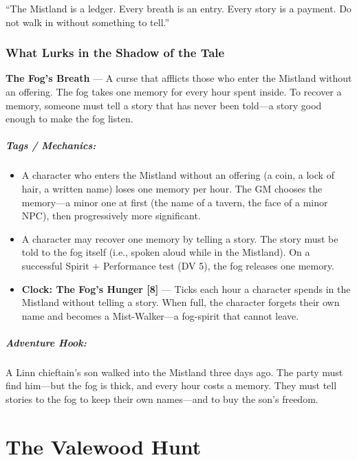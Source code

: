 \documentclass[9pt,a5paper]{extbook}
\begin{document}
``The Mistland is a ledger. Every breath is an entry. Every story is a payment. Do not walk in without something to tell.''

\subsection*{What Lurks in the Shadow of the Tale}

\textbf{The Fog's Breath} --- A curse that afflicts those who enter the Mistland without an offering. The fog takes one memory for every hour spent inside. To recover a memory, someone must tell a story that has never been told---a story good enough to make the fog listen.

\paragraph{Tags / Mechanics:}
\begin{itemize}
    \item A character who enters the Mistland without an offering (a coin, a lock of hair, a written name) loses one memory per hour. The GM chooses the memory---a minor one at first (the name of a tavern, the face of a minor NPC), then progressively more significant.
    \item A character may recover one memory by telling a story. The story must be told to the fog itself (i.e., spoken aloud while in the Mistland). On a successful Spirit + Performance test (DV 5), the fog releases one memory.
    \item \textbf{Clock: The Fog's Hunger [8]} --- Ticks each hour a character spends in the Mistland without telling a story. When full, the character forgets their own name and becomes a Mist-Walker---a fog-spirit that cannot leave.
\end{itemize}

\paragraph{Adventure Hook:}
A Linn chieftain's son walked into the Mistland three days ago. The party must find him---but the fog is thick, and every hour costs a memory. They must tell stories to the fog to keep their own names---and to buy the son's freedom.

\clearpage

\chapter{The Valewood Hunt}
\end{document}

